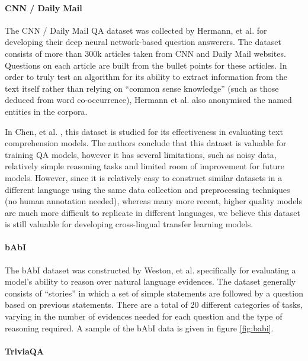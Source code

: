 \documentclass[]{article}
\begin{document}
\paragraph{CNN / Daily Mail }

The CNN / Daily Mail QA dataset was collected by Hermann, et al. \cite{hermann2015teaching} for developing their deep neural network-based question answerers. The  dataset consists of more than 300k articles taken from CNN and Daily Mail websites. Questions on each article are built from the bullet points for these articles. In order to truly test an algorithm for its ability to extract information from the text itself rather than relying on “common sense knowledge” (such as those deduced from word co-occurrence), Hermann et al. also anonymised the named entities in the corpora. 

In Chen, et al. \cite{chen2016thorough}, this dataset is studied for its effectiveness in evaluating text comprehension models. The authors conclude that this dataset is valuable for training QA models, however it has several limitations, such as noisy data, relatively simple reasoning tasks and limited room of improvement for future models. However, since it is relatively easy to construct similar datasets in a different language using the same data collection and preprocessing techniques (no human annotation needed), whereas many more recent, higher quality models are much more difficult to replicate in different languages, we believe this dataset is still valuable for developing cross-lingual transfer learning models.

\paragraph{bAbI} 

The bAbI dataset was constructed by Weston, et al. \cite{weston2015towards} specifically for evaluating a model’s ability to reason over natural language evidences. The dataset generally consists of “stories” in which a set of simple statements are followed by a question based on previous statements. There are a total of 20 different categories of tasks, varying in the number of evidences needed for each question and the type of reasoning required. A sample of the bAbI data is given in figure \ref{fig:babi}.

\paragraph{TriviaQA}
\end{document}
